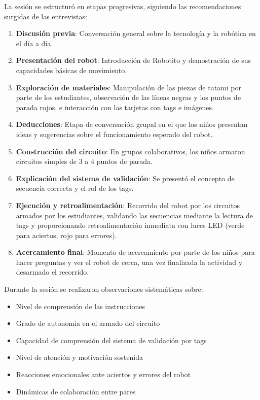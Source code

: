 \documentclass{prgrado}
\begin{document}
La sesión se estructuró en etapas progresivas, siguiendo las recomendaciones surgidas de las entrevistas:
\begin{enumerate}
\item \textbf{Discusión previa}: Conversación general sobre la tecnología y la robótica en el día a día.
\item \textbf{Presentación del robot}: Introducción de Robotito y demostración de sus capacidades básicas de movimiento.
\item \textbf{Exploración de materiales}: Manipulación de las piezas de tatami por parte de los estudiantes, observación de las líneas negras y los puntos de parada rojos, e interacción con las tarjetas con tags e imágenes.
\item \textbf{Deducciones}: Etapa de conversación grupal en el que los niños presentan ideas y sugerencias sobre el funcionamiento esperado del robot.
\item \textbf{Construcción del circuito}: En grupos colaborativos, los niños armaron circuitos simples de 3 a 4 puntos de parada.
\item \textbf{Explicación del sistema de validación}: Se presentó el concepto de secuencia correcta y el rol de los tags.
\item \textbf{Ejecución y retroalimentación}: Recorrido del robot por los circuitos armados por los estudiantes, validando las secuencias mediante la lectura de tags y proporcionando retroalimentación inmediata con luces LED (verde para aciertos, rojo para errores).
\item \textbf{Acercamiento final}: Momento de acercamiento por parte de los niños para hacer preguntas y ver el robot de cerca, una vez finalizada la actividad y desarmado el recorrido.
\end{enumerate}

Durante la sesión se realizaron observaciones sistemáticas sobre:
\begin{itemize}
\item Nivel de comprensión de las instrucciones
\item Grado de autonomía en el armado del circuito
\item Capacidad de comprensión del sistema de validación por tags
\item Nivel de atención y motivación sostenida
\item Reacciones emocionales ante aciertos y errores del robot
\item Dinámicas de colaboración entre pares
\end{itemize}
\end{document}
